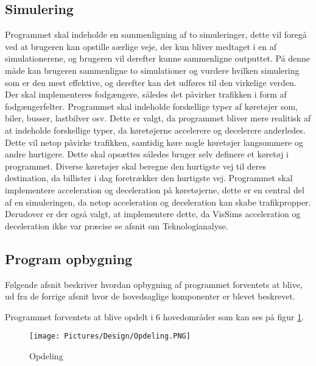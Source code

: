\vspace{5mm}

\subsection{Simulering}
Programmet skal indeholde en sammenligning af to simuleringer, dette vil foregå ved at brugeren kan opstille særlige veje, der kun bliver medtaget i en af simulationerene, og brugeren vil derefter kunne sammenligne outputtet. På denne måde kan brugeren sammenligne to simulationer og vurdere hvilken simulering som er den mest effektive, og derefter kan det udføres til den virkelige verden. Der skal implementeres fodgængere, således det påvirker trafikken i form af fodgængerfelter. Programmet skal indeholde forskellige typer af køretøjer som, biler, busser, lastbilver osv. Dette er valgt, da programmet bliver mere realitisk af at indeholde forskellige typer, da køretøjerne accelerere og decelerere anderledes. Dette vil netop påvirke trafikken, samtidig køre nogle køretøjer langsommere og andre hurtigere. Dette skal opsættes således bruger selv definere et køretøj i programmet.  Diverse køretøjer skal beregne den hurtigste vej til deres destination, da billister i dag foretrækker den hurtigste vej. Programmet skal implementere acceleration og deceleration på køretøjerne, dette er en central del af en simuleringen, da netop acceleration og deceleration kan skabe trafikpropper. Derudover er der også valgt, at implementere dette, da VisSims acceleration og deceleration ikke var præcise se afsnit om Teknologianalyse. 

\vspace{5mm}

\subsection{Program opbygning}\label{ProgramOpbygning}
Følgende afsnit beskriver hvordan opbygning af programmet forventets at blive, ud fra de forrige afsnit hvor de hovedsaglige komponenter er blevet beskrevet.

Programmet forventets at blive opdelt i 6 hovedområder som kan ses på figur \ref{fig:ProgramOpdeling}. 

\begin{figure}[H]
\begin{adjustbox}{width=0.4\textwidth,center=\textwidth}
\centering
\texttt{[image: Pictures/Design/Opdeling.PNG]}
\end{adjustbox}
\caption{Opdeling}
\label{fig:ProgramOpdeling}
\end{figure}

